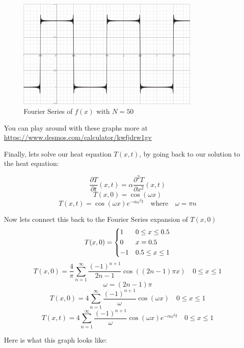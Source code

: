 \documentclass{report}
\newcommand{\heatequation}[0]{\frac{\partial T}{\partial t}(x,t) = \alpha \frac{\partial^2 T}{\partial x^2}(x,t)}
\begin{document}
\begin{figure}[H]
    \centering
    \includegraphics[width=0.8\textwidth]{images/fourier_series/fourier_50.png}
    \caption{Fourier Series of $f(x)$ with $N=50$}
\end{figure}

You can play around with these graphs more at \url{https://www.desmos.com/calculator/kwfjdrw1gv}

Finally, lets solve our heat equation $T(x,t)$, by going back to our solution to the heat equation:

\[ \heatequation \]
\[T(x,0) = \cos(\omega x) \]
\[T(x,t) = \cos(\omega x)e^{-\alpha\omega^2t} \quad \textrm{where} \quad \omega = \pi n\]

Now lets connect this back to the Fourier Series expansion of $T(x,0)$
\[ T(x,0) =
    \begin{dcases}
        1 & 0\leq x \leq 0.5 \\
        0 & x = 0.5 \\
        -1 & 0.5 \leq x \leq 1 \\
    \end{dcases}
\]
\[T(x,0) = \frac{4}{\pi}\sum_{n=1}^{\infty}\frac{\left(-1\right)^{n+1}}{2n-1}\cos\left(\left(2n-1\right)\pi x\right) \quad 0\leq x \leq 1 \]
\[\omega = (2n - 1)\pi \]
\[T(x,0) = 4\sum_{n=1}^{\infty}\frac{\left(-1\right)^{n+1}}{\omega}\cos\left(\omega x\right) \quad 0\leq x \leq 1 \]
\[T(x,t) = 4\sum_{n=1}^{\infty}\frac{\left(-1\right)^{n+1}}{\omega}\cos\left(\omega x\right)e^{-\alpha\omega^2t} \quad 0\leq x \leq 1 \]

Here is what this graph looks like:
\end{document}
